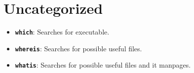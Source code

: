 \section{Uncategorized}
\begin{itemize}
\item \textbf{\texttt{which}}: Searches for executable.
\item \textbf{\texttt{whereis}}: Searches for possible useful files.
\item \textbf{\texttt{whatis}}: Searches for possible useful files and it manpages.
\end{itemize}


\vfill \null
\columnbreak
